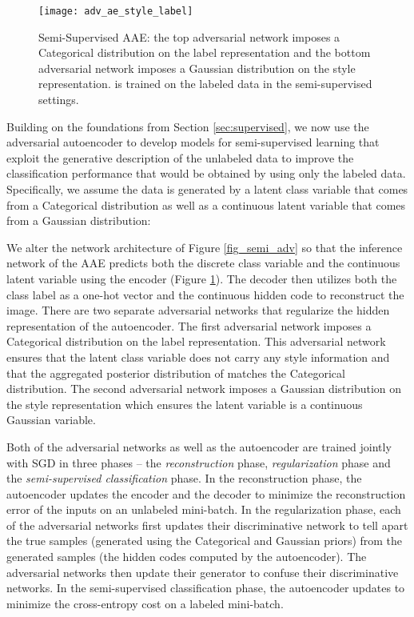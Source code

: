 \documentclass{article}
\begin{document}
\begin{figure}[b]
\begin{center}
\centering 
\texttt{[image: adv\_ae\_style\_label]}
\caption{\label{fig_semi_aae}Semi-Supervised AAE: the top adversarial network imposes a Categorical distribution on the label representation and the bottom adversarial network imposes a Gaussian distribution on the style representation.  is trained on the labeled data in the semi-supervised settings. }
\end{center}
\end{figure}


Building on the foundations from Section \ref{sec:supervised}, we now use the adversarial autoencoder to develop models for semi-supervised learning that exploit the generative description of the unlabeled data to improve the classification performance that would be obtained by using only the labeled data. Specifically, we assume the data is generated by a latent class variable  that comes from a Categorical distribution as well as a continuous latent variable  that comes from a Gaussian distribution:



We alter the network architecture of Figure \ref{fig_semi_adv} so that the inference network of the AAE predicts both the discrete class variable  and the continuous latent variable  using the encoder  (Figure \ref{fig_semi_aae}). The decoder then utilizes both the class label as a one-hot vector and the continuous hidden code  to reconstruct the image. There are two separate adversarial networks that regularize the hidden representation of the autoencoder. The first adversarial network imposes a Categorical distribution on the label representation. This adversarial network ensures that the latent class variable  does not carry any style information and that the aggregated posterior distribution of  matches the Categorical distribution. The second adversarial network imposes a Gaussian distribution on the style representation which ensures the latent variable  is a continuous Gaussian variable.

Both of the adversarial networks as well as the autoencoder are trained jointly with SGD in three phases -- the \emph{reconstruction} phase, \emph{regularization} phase and the \emph{semi-supervised classification} phase. In the reconstruction phase, the autoencoder updates the encoder  and the decoder to minimize the reconstruction error of the inputs on an unlabeled mini-batch. In the regularization phase, each of the adversarial networks first updates their discriminative network to tell apart the true samples (generated using the Categorical and Gaussian priors) from the generated samples (the hidden codes computed by the autoencoder). The adversarial networks then update their generator to confuse their discriminative networks. In the semi-supervised classification phase, the autoencoder updates  to minimize the cross-entropy cost on a labeled mini-batch. 
\end{document}
